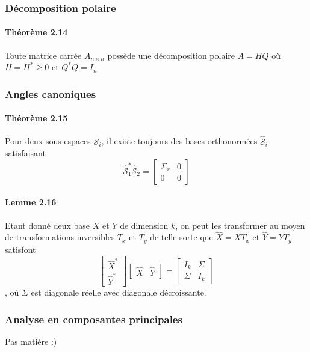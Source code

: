 \subsubsection{Décomposition polaire}

\paragraph{Théorème 2.14} Toute matrice carrée $A_{n\times n}$ possède une décomposition polaire $A = HQ$ où $H = H^* \geq 0$ et $Q^*Q =I_n$

\subsubsection{Angles canoniques}

\paragraph{Théorème 2.15} Pour deux sous-espaces $\mathcal{S}_i$, il existe toujours des bases orthonormées $\hat{\mathcal{S}}_i$ satisfaisant $$\hat{\mathcal{S}}^*_1\hat{\mathcal{S}}_2 = \begin{bmatrix}
\Sigma_r & 0 \\
0 & 0
\end{bmatrix}$$

\paragraph{Lemme 2.16} Etant donné deux base $X$ et $Y$ de dimension $k$, on peut les transformer au moyen de transformations inversibles $T_x$ et $T_y$ de telle sorte que $\hat{X} = XT_x$ et $\hat{Y} = YT_y$ satisfont
$$\begin{bmatrix}
\hat{X}^* \\
\hat{Y}^*
\end{bmatrix}
\begin{bmatrix}
\hat{X} & \hat{Y}
\end{bmatrix}
=
\begin{bmatrix}
I_k & \Sigma \\
\Sigma & I_k
\end{bmatrix} $$, où $\Sigma$ est diagonale réelle avec diagonale décroissante.

\subsubsection{Analyse en composantes principales}
Pas matière :)

